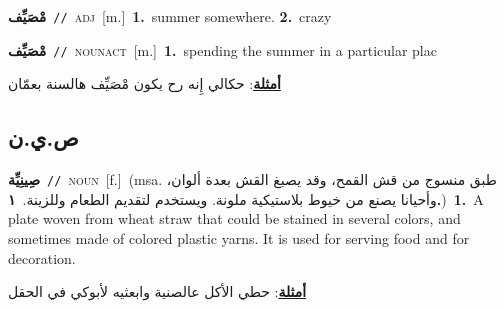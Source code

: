 \documentclass[10pt,a4paper,twoside]{article} %
\begin{document}
\begin{multicols}{2}
{\setlength\topsep{0pt}\textbf{\foreignlanguage{arabic}{مْصَيِّف}}\ {\color{gray}\texttt{//}\color{black}}\ \textsc{adj}\ [m.]\ \textbf{1.}~summer somewhere.  \textbf{2.}~crazy\ } \vspace{2mm}

{\setlength\topsep{0pt}\textbf{\foreignlanguage{arabic}{مْصَيِّف}}\ {\color{gray}\texttt{//}\color{black}}\ \textsc{noun\textunderscore act}\ [m.]\ \textbf{1.}~spending the summer in a particular plac\  \begin{flushright}\color{gray}\foreignlanguage{arabic}{\textbf{\underline{\foreignlanguage{arabic}{أمثلة}}}: حكالي إِنه رح يكون مْصَيِّف هالسنة بعمّان}\end{flushright}\color{black}} \vspace{2mm}

\vspace{-3mm}
\subsection*{\color{blue}\foreignlanguage{arabic}{ص.ي.ن}\color{blue}{}} 

{\setlength\topsep{0pt}\textbf{\foreignlanguage{arabic}{صِينِيِّة}}\ {\color{gray}\texttt{//}\color{black}}\ \textsc{noun}\ [f.]\ \color{gray}(msa. \foreignlanguage{arabic}{طبق منسوج من قش القمح، وقد يصبغ القش بعدة ألوان، وأحيانا يصنع من خيوط بلاستيكية ملونة. ويستخدم لتقديم الطعام وللزينة.}~\foreignlanguage{arabic}{\textbf{١.}})\color{black}\ \textbf{1.}~A plate woven from wheat straw that could be stained in several colors, and sometimes made of colored plastic yarns. It is used for serving food and for decoration.\  \begin{flushright}\color{gray}\foreignlanguage{arabic}{\textbf{\underline{\foreignlanguage{arabic}{أمثلة}}}: حطي الأكل عالصنية وابعثيه لأبوكي في الحقل}\end{flushright}\color{black}} \vspace{2mm}

\end{multicols}
\end{document}
